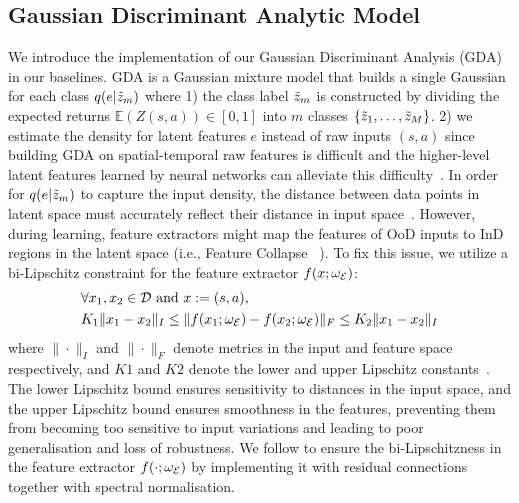 \documentclass{article}
\newcommand{\modelParamter}{\omega}
\newcommand{\datapoint}{x}
\newcommand{\state}{s}
\newcommand{\action}{a}
\newcommand{\dataset}{\mathcal{D}}
\newcommand{\expect}{\mathbb{E}}
\newcommand{\feature}{e}
\newcommand{\splitnum}{m}
\begin{document}
\subsection{Gaussian Discriminant Analytic Model}
We introduce the implementation of our Gaussian Discriminant Analysis
(GDA) in our baselines. GDA is a Gaussian mixture model that builds a single Gaussian for each class $q(\feature|\Tilde{z}_{\splitnum})$ where 1) the class label $\Tilde{z}_{\splitnum}$ is constructed by dividing the expected returns $\expect(Z(\state,\action))\in[0,1]$ into $\splitnum$ classes $\{\Tilde{z}_{1},\dots,\Tilde{z}_{\MakeUppercase{\splitnum}}\}$. 2) we estimate the density for latent features $\feature$ instead of raw inputs $(\state,\action)$ since building GDA on spatial-temporal raw features is difficult and the higher-level latent features learned by neural networks can alleviate this difficulty~\cite{Mukhoti2021Uncertainty}. In order for $q(\feature|\Tilde{z}_{\splitnum})$ to capture the input density, the distance between data points in latent space must accurately reflect their distance in input space~\cite{Liu2020Uncertainty}. However, during learning, feature extractors might map the features of OoD inputs to InD regions in the latent space (i.e., Feature Collapse~\cite{Amersfoort2020Uncertainty} ). To fix this issue, we utilize a bi-Lipschitz constraint for the feature extractor $f(\datapoint;\modelParamter_{\mathcal{\MakeUppercase{\feature}}})$:
\begin{align}
    & \forall{\datapoint_{1},\datapoint_{2}}\in\dataset \text{ and } \datapoint:=(\state,\action),\\
    & K_{1}\|\datapoint_{1}-\datapoint_{2}\|_{I}\leq\|f(\datapoint_{1};\modelParamter_{\mathcal{\MakeUppercase{\feature}}})-f(\datapoint_{2};\modelParamter_{\mathcal{\MakeUppercase{\feature}}})\|_{F}\leq K_{2}\|\datapoint_{1}-\datapoint_{2}\|_{I}\nonumber
\end{align}
where $\|\cdot\|_{I}$ and $\|\cdot\|_{F}$ denote metrics in the input and feature space
respectively, and $K1$ and $K2$ denote the lower and upper Lipschitz constants~\cite{Rosca2020smoothness}. The lower Lipschitz bound ensures sensitivity to distances in the input space, and the upper Lipschitz bound ensures smoothness in the features, preventing them from becoming too sensitive to input variations and leading to poor
generalisation and loss of robustness. We follow \cite{Liu2020Uncertainty} to ensure the bi-Lipschitzness in the feature extractor $f(\cdot;\modelParamter_{\mathcal{\MakeUppercase{\feature}}})$ by implementing it with residual connections together with spectral normalisation.
\end{document}
